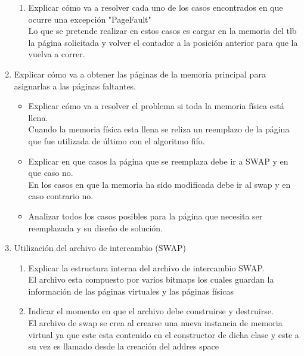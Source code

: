 \documentclass[11pt]{article}
\begin{document}
\begin{enumerate}
\begin{enumerate}
            \item Explicar cómo va a resolver cada uno de los casos encontrados en que ocurre una excepción "PageFault"\\
            Lo  que se pretende realizar en estos casos es cargar en la memoria del tlb la página solicitada y volver el contador a la posición anterior para que la vuelva a correr.
            
          \end{enumerate}
          \item Explicar cómo va a obtener las páginas de la memoria principal para asignarlas a las páginas faltantes.
          \begin{itemize}
            \item Explicar cómo va a resolver el problema si toda la memoria física está llena.\\
            Cuando la memoria física esta llena se reliza un reemplazo de la página que fue utilizada de último con el algoritmo fifo.
            \item Explicar en que casos la página que se reemplaza debe ir a SWAP y en que caso no.\\
            En los casos en que la memoria ha sido modificada debe ir al swap y en caso contrario no.
            \item Analizar todos los casos posibles para la página que necesita ser reemplazada y su diseño de solución.\\
            
          \end{itemize}
          \item Utilización del archivo de intercambio (SWAP)
          \begin{enumerate}
            \item Explicar la estructura interna del archivo de intercambio SWAP.\\
            El archivo esta compuesto por varios bitmaps los cuales guardan la información de las páginas virtuales y las páginas físicas
            
            \item Indicar el momento en que el archivo debe construirse y destruirse.\\
            El archivo de swap se crea al crearse una nueva instancia de memoria virtual ya que este esta contenido en el constructor de dicha clase y este a su vez es llamado desde la creación del addres space
            

\end{enumerate}
\end{enumerate}
\end{document}
